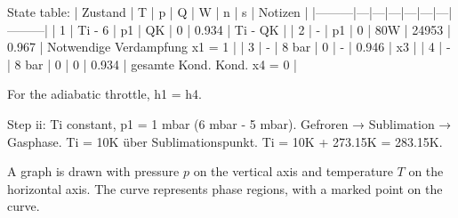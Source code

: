 State table:  
| Zustand | T | p | Q | W | n | s | Notizen |  
|---------|---|---|---|---|---|---|---------|  
| 1       | Ti - 6 | p1 | QK | 0 | 0.934 | Ti - QK |  
| 2       | -       | p1 | 0 | 80W | 24953 | 0.967 | Notwendige Verdampfung x1 = 1 |  
| 3       | -       | 8 bar | 0 | - | 0.946 | x3 |  
| 4       | -       | 8 bar | 0 | 0 | 0.934 | gesamte Kond. Kond. x4 = 0 |  

For the adiabatic throttle, h1 = h4.  

Step ii:  
Ti constant, p1 = 1 mbar (6 mbar - 5 mbar).  
Gefroren → Sublimation → Gasphase.  
Ti = 10K über Sublimationspunkt.  
Ti = 10K + 273.15K = 283.15K.

A graph is drawn with pressure \( p \) on the vertical axis and temperature \( T \) on the horizontal axis.  
The curve represents phase regions, with a marked point on the curve.